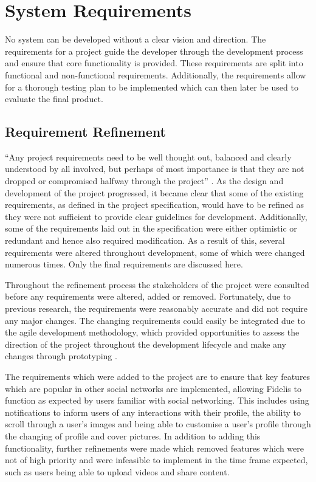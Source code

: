 \chapter{System Requirements}
\label{Chapter:SystemRequirements}
No system can be developed without a clear vision and direction. The requirements for a project guide the developer through the development process and ensure that core functionality is provided. These requirements are split into functional and non-functional requirements. Additionally, the requirements allow for a thorough testing plan to be implemented which can then later be used to evaluate the final product. 

\section{Requirement Refinement}
``Any project requirements need to be well thought out, balanced and clearly understood by all involved, but perhaps of most importance is that they are not dropped or compromised halfway through the project'' \cite{ReQTest:Requirements}. As the design and development of the project progressed, it became clear that some of the existing requirements, as defined in the project specification, would have to be refined as they were not sufficient to provide clear guidelines for development. Additionally, some of the requirements laid out in the specification were either optimistic or redundant and hence also required modification. As a result of this, several requirements were altered throughout development, some of which were changed numerous times. Only the final requirements are discussed here.

Throughout the refinement process the stakeholders of the project were consulted before any requirements were altered, added or removed. Fortunately, due to previous research, the requirements were reasonably accurate and did not require any major changes. The changing requirements could easily be integrated due to the agile development methodology, which provided opportunities to assess the direction of the project throughout the development lifecycle and make any changes through prototyping \cite{Agile:Home}.

The requirements which were added to the project are to ensure that key features which are popular in other social networks are implemented, allowing Fidelis to function as expected by users familiar with social networking. This includes using notifications to inform users of any interactions with their profile, the ability to scroll through a user's images and being able to customise a user's profile through the changing of profile and cover pictures. In addition to adding this functionality, further refinements were made which removed features which were not of high priority and were infeasible to implement in the time frame expected, such as users being able to upload videos and share content.

